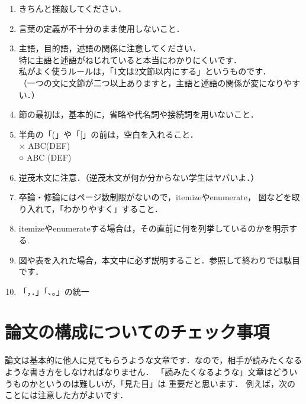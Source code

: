 \begin{minipage}{\hsize}
\begin{enumerate}
\item きちんと推敲してください．
\item 言葉の定義が不十分のまま使用しないこと．
\item 主語，目的語，述語の関係に注意してください．\\
      特に主語と述語がねじれていると本当にわかりにくいです．\\
      私がよく使うルールは，「1文は2文節以内にする」というものです．\\
      （一つの文に文節が二つ以上ありますと，主語と述語の関係が変になりやすい．）
\item 節の最初は，基本的に，省略や代名詞や接続詞を用いないこと．
\item 半角の「(」や「[」の前は，空白を入れること．\\
      × ABC(DEF) \\
      ○ ABC (DEF)
\item 逆茂木文に注意．（逆茂木文が何か分からない学生はヤバいよ．）
\item 卒論・修論にはページ数制限がないので，itemizeやenumerate，
      図などを取り入れて，「わかりやすく」すること．
\item itemizeやenumerateする場合は，その直前に何を列挙しているのかを明示する.
\item 図や表を入れた場合，本文中に必ず説明すること．参照して終わりでは駄目です．
\item 「，．」「、。」の統一
\end{enumerate}
\end{minipage}

\section{論文の構成についてのチェック事項}
論文は基本的に他人に見てもらうような文章です．なので，相手が読みたくなるような書き方をしなければなりません．
「読みたくなるような」文章はどういうものかというのは難しいが，「見た目」は 重要だと思います．
例えば，次のことには注意した方がよいです．

